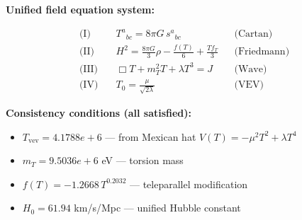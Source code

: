 
\textbf{Unified field equation system:}

\begin{align}
  \text{(I)} \quad & T^a{}_{bc} = 8\pi G \, s^a{}_{bc} && \text{(Cartan)} \\
  \text{(II)} \quad & H^2 = \frac{8\pi G}{3}\rho - \frac{f(T)}{6} + \frac{Tf_T}{3} && \text{(Friedmann)} \\
  \text{(III)} \quad & \Box T + m_T^2 T + \lambda T^3 = J && \text{(Wave)} \\
  \text{(IV)} \quad & T_0 = \frac{\mu}{\sqrt{2\lambda}} && \text{(VEV)}
\end{align}

\textbf{Consistency conditions (all satisfied):}
\begin{itemize}
  \item $T_{\text{vev}} = 4.1788e+6$ — from Mexican hat $V(T) = -\mu^2 T^2 + \lambda T^4$
  \item $m_T = 9.5036e+6$ eV — torsion mass
  \item $f(T) = -1.2668 \, T^{0.2032}$ — teleparallel modification
  \item $H_0 = 61.94$ km/s/Mpc — unified Hubble constant
\end{itemize}